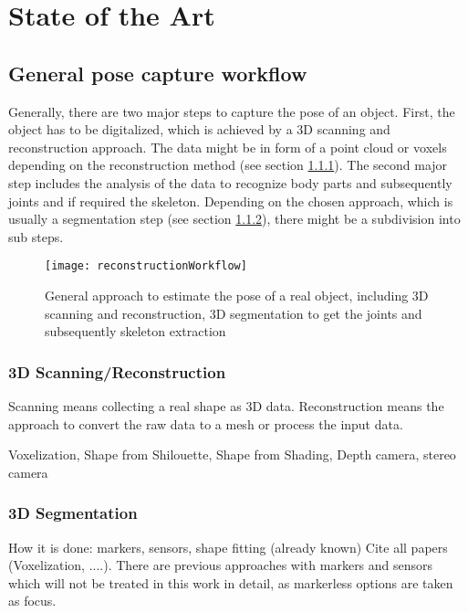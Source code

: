 \chapter{State of the Art}
\label{cha:StateOfTheArt}

\section{General pose capture workflow}
\label{PoseCapture}
Generally, there are two major steps to capture the pose of an object. First, the object has to be digitalized, which is achieved by a 3D scanning and reconstruction approach. The data might be in form of a point cloud or voxels depending on the reconstruction method (see section \ref{sec:reconstruction}). The second major step includes the analysis of the data to recognize body parts and subsequently joints and if required the skeleton. Depending on the chosen approach, which is usually a segmentation step (see section \ref{sec:segmentation}), there might be a subdivision into sub steps.
%
%
\begin{figure}
	\centering
	\texttt{[image: reconstructionWorkflow]}
	\caption{General approach to estimate the pose of a real object, including 3D scanning and reconstruction, 3D segmentation to get the joints and subsequently skeleton extraction}
	\label{fig:posecapture}
\end{figure}
%
\subsection{3D Scanning/Reconstruction}
\label{sec:reconstruction}
%
%
Scanning means collecting a real shape as 3D data. Reconstruction means the approach to convert the raw data to a mesh or process the input data.

Voxelization, Shape from Shilouette, Shape from Shading, Depth camera, stereo camera
%
%
\subsection{3D Segmentation}
\label{sec:segmentation}
%
%
How it is done: markers, sensors, shape fitting (already known)
Cite all papers (Voxelization, ....). There are previous approaches with markers and sensors which will not be treated in this work in detail, as markerless options are taken as focus.

